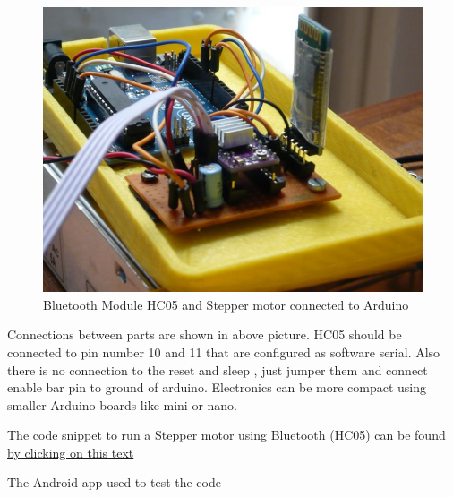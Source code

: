 \documentclass[MTech]{iitmdiss}
\begin{document}
	\begin{figure}[h]
		\includegraphics[width=\linewidth]{ffigures/hc05hc05}
		\centering
		\caption{Bluetooth Module HC05 and Stepper motor connected to Arduino}
		\label{fig:hc05hc05}
	
	\end{figure}
	
	
Connections between parts are shown in above picture. HC05 should be connected to pin number 10 and 11 that are configured as software serial. Also there is no connection to the reset and sleep , just jumper them and connect enable bar pin to ground of arduino. Electronics can be more compact using smaller Arduino boards like mini or nano.


\hyperref[sec:code2]{The code snippet to run a Stepper motor using Bluetooth (HC05) can be found by clicking on this text}



The Android app used to test the code
\end{document}
